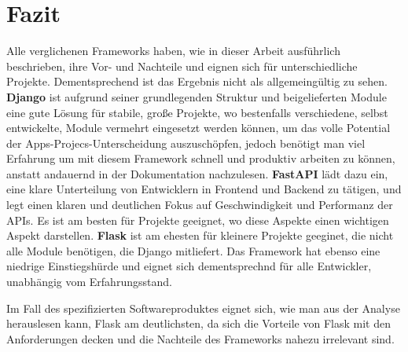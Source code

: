 \documentclass[letterpaper,11pt,leqno]{article}
\begin{document}
\section{Fazit}
Alle verglichenen Frameworks haben, wie in dieser Arbeit ausführlich beschrieben, ihre Vor- und Nachteile und eignen sich für
unterschiedliche Projekte. Dementsprechend ist das Ergebnis nicht als allgemeingültig zu sehen. \textbf{Django} ist aufgrund seiner
grundlegenden Struktur und beigelieferten Module eine gute Lösung für stabile, große Projekte, wo bestenfalls verschiedene, selbst
entwickelte, Module vermehrt eingesetzt werden können, um das volle Potential der Apps-Projecs-Unterscheidung auszuschöpfen, jedoch
benötigt man viel Erfahrung um mit diesem Framework schnell und produktiv arbeiten zu können, anstatt andauernd in der
Dokumentation nachzulesen. \textbf{FastAPI} lädt dazu ein, eine klare Unterteilung von Entwicklern in Frontend und Backend zu
tätigen, und legt einen klaren und deutlichen Fokus auf Geschwindigkeit und Performanz der APIs. Es ist am besten für Projekte
geeignet, wo diese Aspekte einen wichtigen Aspekt darstellen. \textbf{Flask} ist am ehesten für kleinere Projekte geeginet, die
nicht alle Module benötigen, die Django mitliefert. Das Framework hat ebenso eine niedrige Einstiegshürde und eignet sich
dementsprechnd für alle Entwickler, unabhängig vom Erfahrungsstand.

Im Fall des spezifizierten Softwareproduktes eignet sich, wie man aus der Analyse herauslesen kann, Flask am deutlichsten, da sich
die Vorteile von Flask mit den Anforderungen decken und die Nachteile des Frameworks nahezu irrelevant sind.

\clearpage
\end{document}
